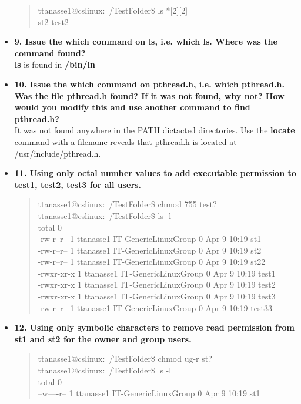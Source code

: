 \documentclass{article}
\begin{document}
\begin{itemize}
\begin{quote}
  ttanasse1@cslinux:~/TestFolder\$ ls *[\^2][2]\\
st2  test2
\end{quote}
\item \textbf{9. Issue the which command on ls, i.e. which ls.  Where was the command found?}\\
\textbf{ls} is found in \textbf{/bin/ln}
\item \textbf{10. Issue the which command on pthread.h, i.e. which pthread.h.  Was the file pthread.h found? If it was not found, why not? How would you modify this and use another command to find pthread.h?}\\
It was not found anywhere in the PATH dictacted directories. Use the \textbf{locate} command with a filename reveals that pthread.h is located at /usr/include/pthread.h.
\item \textbf{11. Using only octal number values to add executable permission to test1, test2, test3 for all users.}
\begin{quote}
  ttanasse1@cslinux:~/TestFolder\$ chmod 755 test?\\
ttanasse1@cslinux:~/TestFolder\$ ls -l\\
total 0\\
-rw-r--r-- 1 ttanasse1 IT-GenericLinuxGroup 0 Apr  9 10:19 st1\\
-rw-r--r-- 1 ttanasse1 IT-GenericLinuxGroup 0 Apr  9 10:19 st2\\
-rw-r--r-- 1 ttanasse1 IT-GenericLinuxGroup 0 Apr  9 10:19 st22\\
-rwxr-xr-x 1 ttanasse1 IT-GenericLinuxGroup 0 Apr  9 10:19 test1\\
-rwxr-xr-x 1 ttanasse1 IT-GenericLinuxGroup 0 Apr  9 10:19 test2\\
-rwxr-xr-x 1 ttanasse1 IT-GenericLinuxGroup 0 Apr  9 10:19 test3\\
-rw-r--r-- 1 ttanasse1 IT-GenericLinuxGroup 0 Apr  9 10:19 test33
\end{quote}
\item \textbf{12. Using only symbolic characters to remove read permission from st1 and st2 for the owner and group users.}
\begin{quote}
  ttanasse1@cslinux:~/TestFolder\$ chmod ug-r st?\\
ttanasse1@cslinux:~/TestFolder\$ ls -l\\
total 0\\
--w----r-- 1 ttanasse1 IT-GenericLinuxGroup 0 Apr  9 10:19 st1\\

\end{quote}
\end{itemize}
\end{document}

